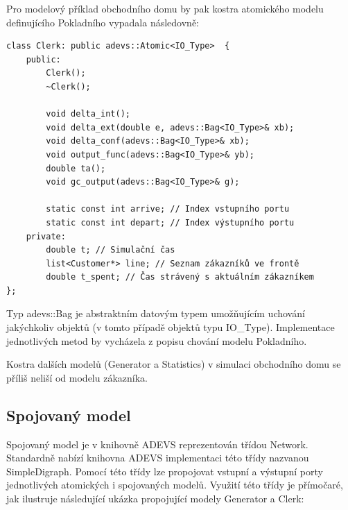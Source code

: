Pro modelový příklad obchodního domu by pak kostra atomického modelu definujícího Pokladního vypadala následovně:

\begin{lstlisting}
class Clerk: public adevs::Atomic<IO_Type>  {
    public:
        Clerk();
        ~Clerk();

        void delta_int();
        void delta_ext(double e, adevs::Bag<IO_Type>& xb);
        void delta_conf(adevs::Bag<IO_Type>& xb);
        void output_func(adevs::Bag<IO_Type>& yb);
        double ta();
        void gc_output(adevs::Bag<IO_Type>& g);
        
        static const int arrive; // Index vstupního portu
        static const int depart; // Index výstupního portu
    private:
        double t; // Simulační čas
        list<Customer*> line; // Seznam zákazníků ve frontě
        double t_spent; // Čas strávený s aktuálním zákazníkem
};
\end{lstlisting}

Typ adevs::Bag je abstraktním datovým typem umožňujícím uchování jakýchkoliv objektů (v tomto případě objektů typu IO\_Type). Implementace jednotlivých metod by vycházela z popisu chování modelu Pokladního.

Kostra dalších modelů (Generator a Statistics) v simulaci obchodního domu se příliš neliší od modelu zákazníka.

\subsection{Spojovaný model}

Spojovaný model je v knihovně ADEVS reprezentován třídou Network. Standardně nabízí knihovna ADEVS implementaci této třídy nazvanou SimpleDigraph. Pomocí této třídy lze propojovat vstupní a výstupní porty jednotlivých atomických i spojovaných modelů. Využití této třídy je přímočaré, jak ilustruje následující ukázka propojující modely Generator a Clerk:

